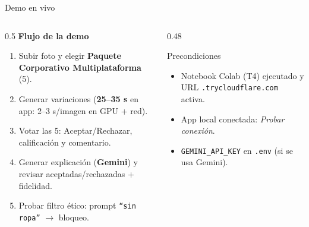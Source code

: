 \documentclass[aspectratio=169,11pt]{beamer}
\begin{document}
\begin{frame}{Demo en vivo}
  \begin{columns}[T]
    \begin{column}{0.5\textwidth}
      \textbf{Flujo de la demo}
      \begin{enumerate}
        \item Subir foto y elegir \textbf{Paquete Corporativo Multiplataforma} (5).
        \item Generar variaciones (\textbf{25--35 s} en app: 2--3 s/imagen en GPU + red).
        \item Votar las 5: Aceptar/Rechazar, calificación y comentario.
        \item Generar explicación (\textbf{Gemini}) y revisar aceptadas/rechazadas + fidelidad.
        \item Probar filtro ético: prompt \texttt{``sin ropa''} $\rightarrow$ bloqueo.
      \end{enumerate}
    \end{column}
    \begin{column}{0.48\textwidth}
      \begin{block}{Precondiciones}
        \begin{itemize}
          \item Notebook Colab (T4) ejecutado y URL \texttt{.trycloudflare.com} activa.
          \item App local conectada: \emph{Probar conexión}.
          \item \texttt{GEMINI\_API\_KEY} en \texttt{.env} (si se usa Gemini).
        \end{itemize}
      \end{block}
    \end{column}
  \end{columns}
\end{frame}
\end{document}
